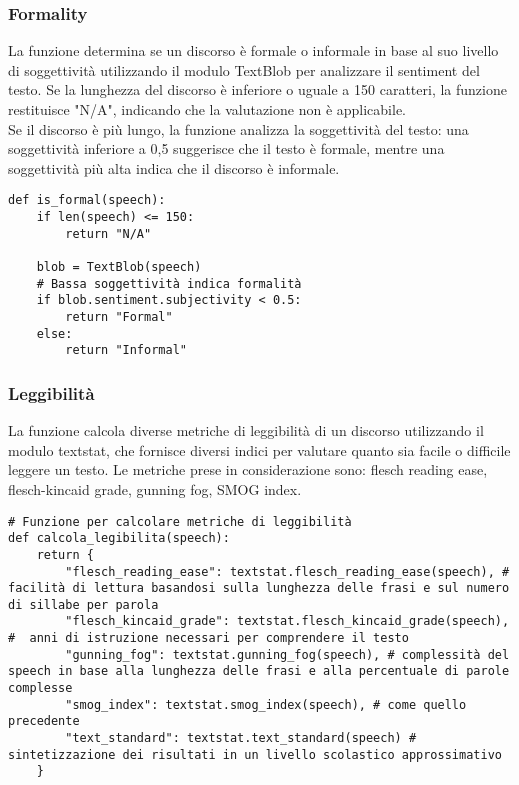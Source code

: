 \documentclass[12pt]{article}
\begin{document}
		\subsubsection{Formality}
La funzione determina se un discorso è formale o informale in base al suo livello di soggettività utilizzando il modulo TextBlob per analizzare il sentiment del testo. Se la lunghezza del discorso è inferiore o uguale a 150 caratteri, la funzione restituisce "N/A", indicando che la valutazione non è applicabile.\\
Se il discorso è più lungo, la funzione analizza la soggettività del testo: una soggettività inferiore a 0,5 suggerisce che il testo è formale, mentre una soggettività più alta indica che il discorso è informale.	
	\begin{lstlisting}
def is_formal(speech):
	if len(speech) <= 150:
		return "N/A"
	
	blob = TextBlob(speech)
	# Bassa soggettività indica formalità
	if blob.sentiment.subjectivity < 0.5:
		return "Formal"
	else:
		return "Informal"
	\end{lstlisting}
	
		\subsubsection{Leggibilità}
La funzione calcola diverse metriche di leggibilità di un discorso utilizzando il modulo textstat, che fornisce diversi indici per valutare quanto sia facile o difficile leggere un testo. Le metriche prese in considerazione sono: flesch reading ease, flesch-kincaid grade, gunning fog, SMOG index.
	\begin{lstlisting}
# Funzione per calcolare metriche di leggibilità
def calcola_legibilita(speech):
	return {
		"flesch_reading_ease": textstat.flesch_reading_ease(speech), # facilità di lettura basandosi sulla lunghezza delle frasi e sul numero di sillabe per parola
		"flesch_kincaid_grade": textstat.flesch_kincaid_grade(speech), #  anni di istruzione necessari per comprendere il testo
		"gunning_fog": textstat.gunning_fog(speech), # complessità del speech in base alla lunghezza delle frasi e alla percentuale di parole complesse
		"smog_index": textstat.smog_index(speech), # come quello precedente
		"text_standard": textstat.text_standard(speech) # sintetizzazione dei risultati in un livello scolastico approssimativo
	}
	\end{lstlisting}
	
\end{document}
